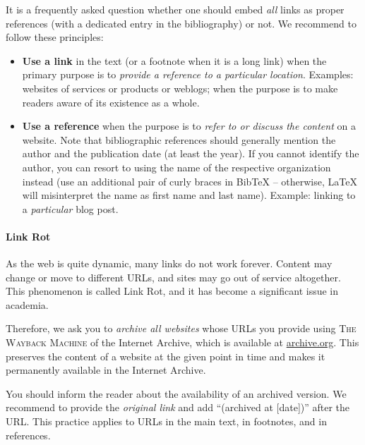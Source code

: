It is a frequently asked question whether one should embed \emph{all} links as proper references (with a dedicated entry in the bibliography) or not. We recommend to follow these principles:%

\begin{itemize}
  \item \textbf{Use a link} in the text (or a footnote when it is a long link) when the primary purpose is to \emph{provide a reference to a particular location}. Examples: websites of services or products or weblogs; when the purpose is to make readers aware of its existence as a whole.
  \item \textbf{Use a reference} when the purpose is to \emph{refer to or discuss the content} on a website. Note that bibliographic references should generally mention the author and the publication date (at least the year). If you cannot identify the author, you can resort to using the name of the respective organization instead (use an additional pair of curly braces in BibTeX -- otherwise, LaTeX will misinterpret the name as first name and last name). Example: linking to a \emph{particular} blog post.
\end{itemize}

\paragraph{Link Rot}

As the web is quite dynamic, many links do not work forever.%
Content may change or move to different URLs, and sites may go out of service altogether. This phenomenon is called Link Rot, and it has become a significant issue in academia.

Therefore, we ask you to \emph{archive all websites} whose URLs you provide using \textsc{The Wayback Machine} of the Internet Archive, which is available at \url{archive.org}.
This preserves the content of a website at the given point in time and makes it permanently available in the Internet Archive.

You should inform the reader about the availability of an archived version.%
We recommend to provide the \emph{original link} and add ``(archived at [date])'' after the URL. This practice applies to URLs in the main text, in footnotes, and in references.

